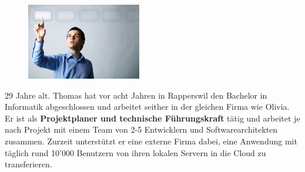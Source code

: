 \begin{description}
\begin{minipage}[t]{0.35\textwidth}
\begin{figure}[H]
						\includegraphics[trim=0cm 0cm 0cm 0cm, clip=true, width=5cm]{requirements/media/img/thomasBucher.jpg}
						\caption[Symbolbild Persona Thomas Bucher\newline
						]
						{\label{Thomas Bucher}}
					\end{figure}
				\end{minipage}
				\begin{minipage}[t]{0.55\textwidth}
					29 Jahre alt.
					Thomas hat vor acht Jahren in Rapperswil den Bachelor in Informatik abgeschlossen und arbeitet seither in der gleichen Firma wie Olivia.
					Er ist als \textbf{Projektplaner und technische Führungskraft} tätig und
					arbeitet je nach Projekt mit einem Team von 2-5 Entwicklern und Softwarearchitekten zusammen.
					Zurzeit unterstützt er eine externe Firma dabei,
					eine Anwendung mit täglich rund 10'000 Benutzern von ihren lokalen Servern in die Cloud zu transferieren.
				\end{minipage}
		\end{description}
		
